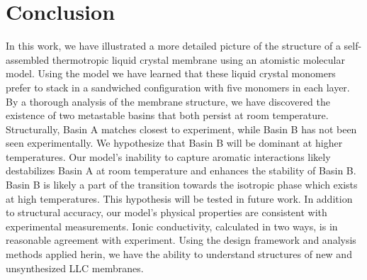 \section*{Conclusion}

In this work, we have illustrated a more detailed picture of the structure 
of a self-assembled thermotropic liquid crystal membrane using an atomistic 
molecular model. Using the model we have learned that these liquid crystal
monomers prefer to stack in a sandwiched configuration with five monomers
in each layer. By a thorough analysis of the membrane structure, we have
discovered the existence of two metastable basins that both persist at room
temperature. Structurally, Basin A matches closest to experiment, while 
Basin B has not been seen experimentally. We hypothesize that Basin B will
be dominant at higher temperatures. Our model's inability to capture aromatic
interactions likely destabilizes Basin A at room temperature and enhances 
the stability of Basin B. Basin B is likely a part of the transition towards
the isotropic phase which exists at high temperatures. This hypothesis will
be tested in future work. In addition to structural accuracy, our model's
physical properties are consistent with experimental measurements. Ionic
conductivity, calculated
in two ways, is in reasonable agreement with experiment. Using the design
framework and analysis methods applied herin, we have the ability to 
understand structures of new and unsynthesized LLC membranes.
